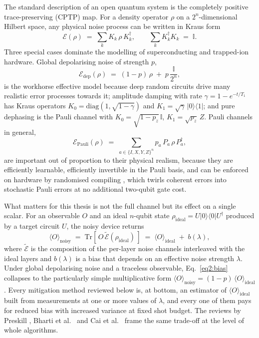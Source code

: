 \documentclass[Thesis.tex]{subfiles}
\begin{document}
The standard description of an open quantum system is the completely positive
trace-preserving (CPTP) map. For a density operator $\rho$ on a
$2^{n}$-dimensional Hilbert space, any physical noise process can be written
in Kraus form \cite{nielsen2012book}
\begin{equation}
  \mathcal{E}(\rho) \;=\; \sum_{k} K_{k}\,\rho\,K_{k}^{\dagger},
  \qquad \sum_{k} K_{k}^{\dagger}K_{k} \;=\; \mathbb{I}.
  \label{eq2:kraus}
\end{equation}
Three special cases dominate the modelling of superconducting and trapped-ion
hardware. Global depolarising noise of strength $p$,
\begin{equation}
  \mathcal{E}_{\mathrm{dep}}(\rho) \;=\; (1-p)\,\rho \;+\; p\,\frac{\mathbb{I}}{2^{n}},
  \label{eq2:depol}
\end{equation}
is the workhorse effective model because deep random circuits drive many
realistic error processes towards it; amplitude damping with rate
$\gamma = 1 - e^{-t/T_{1}}$ has Kraus operators
$K_{0} = \mathrm{diag}(1,\sqrt{1-\gamma})$ and
$K_{1} = \sqrt{\gamma}\,\lvert 0\rangle\langle 1\rvert$; and pure dephasing is
the Pauli channel with $K_{0}=\sqrt{1-p_{z}}\,\mathbb{I}$,
$K_{1}=\sqrt{p_{z}}\,Z$. Pauli channels in general,
\begin{equation}
  \mathcal{E}_{\mathrm{Pauli}}(\rho) \;=\; \sum_{a \in \{I,X,Y,Z\}^{n}} p_{a}\, P_{a}\,\rho\,P_{a}^{\dagger},
  \label{eq2:pauli}
\end{equation}
are important out of proportion to their physical realism, because they are
efficiently learnable, efficiently invertible in the Pauli basis, and can be
enforced on hardware by randomised compiling \cite{wallman2016noise}, which
twirls coherent errors into stochastic Pauli errors at no additional two-qubit
gate cost.

What matters for this thesis is not the full channel but its effect on a single
scalar. For an observable $O$ and an ideal $n$-qubit state
$\rho_{\mathrm{ideal}} = U\lvert 0\rangle\langle 0\rvert U^{\dagger}$ produced
by a target circuit $U$, the noisy device returns
\begin{equation}
  \langle O\rangle_{\mathrm{noisy}} \;=\; \mathrm{Tr}\!\left[\,O\,\widetilde{\mathcal{E}}(\rho_{\mathrm{ideal}})\,\right]
  \;=\; \langle O\rangle_{\mathrm{ideal}} \;+\; b(\lambda),
  \label{eq2:bias}
\end{equation}
where $\widetilde{\mathcal{E}}$ is the composition of the per-layer noise
channels interleaved with the ideal layers and $b(\lambda)$ is a bias that
depends on an effective noise strength $\lambda$. Under global depolarising
noise and a traceless observable, Eq.~\eqref{eq2:bias} collapses to the
particularly simple multiplicative form
$\langle O\rangle_{\mathrm{noisy}} = (1-p)\,\langle O\rangle_{\mathrm{ideal}}$.
Every mitigation method reviewed below is, at bottom, an estimator of
$\langle O\rangle_{\mathrm{ideal}}$ built from measurements at one or more
values of $\lambda$, and every one of them pays for reduced bias with increased
variance at fixed shot budget. The reviews by Preskill
\cite{preskill2018nisq}, Bharti et al.\ \cite{bharti2022noisy} and Cai et al.\
\cite{cai2023review} frame the same trade-off at the level of whole
algorithms.
\end{document}
